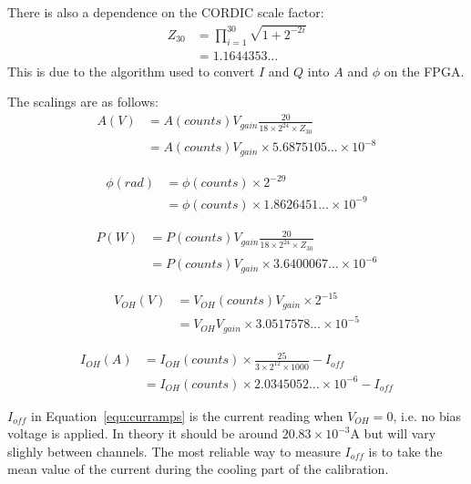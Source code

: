 \documentclass[12pt,a4paper]{article}
\begin{document}
There is also a dependence on the CORDIC scale factor:
\begin{equation}
  \label{equ:cordic}
  \begin{split}
    Z_{30} &= \prod_{i=1}^{30}\sqrt{1 + 2^{-2i}} \\
    &= 1.1644353\ldots
  \end{split}
\end{equation}
This is due to the algorithm used to convert $I$ and $Q$ into $A$ and $\phi$ on the FPGA.

The scalings are as follows:
\begin{equation}
  \label{equ:avolts}
  \begin{split}
    A(V) &= A(counts) V_{gain} \frac{20}{18 \times 2^{24} \times Z_{30}} \\
    &= A(counts) V_{gain} \times 5.6875105\ldots \times 10^{-8}
  \end{split}
\end{equation}

\begin{equation}
  \label{equ:phirad}
  \begin{split}
    \phi(rad) &= \phi(counts) \times 2^{-29} \\
    &= \phi(counts) \times 1.8626451\ldots \times 10^{-9}
  \end{split}
\end{equation}

\begin{equation}
  \label{equ:pwatts}
  \begin{split}
    P(W) &= P(counts) V_{gain} \frac{20}{18 \times 2^{24} \times Z_{30}} \\
    &= P(counts) V_{gain} \times 3.6400067\ldots \times 10^{-6}
  \end{split}
\end{equation}

\begin{equation}
  \label{equ:vdcvolts}
  \begin{split}
    V_{OH}(V) &= V_{OH}(counts) V_{gain} \times 2^{-15} \\
    &= V_{OH} V_{gain} \times 3.0517578\ldots \times 10^{-5}
  \end{split}
\end{equation}

\begin{equation}
  \label{equ:curramps}
  \begin{split}
    I_{OH}(A) &= I_{OH}(counts) \times \frac{25}{3 \times 2^{12} \times 1000} - I_{off} \\
    &= I_{OH}(counts) \times 2.0345052\ldots \times 10^{-6} - I_{off}
  \end{split}
\end{equation}

$I_{off}$ in Equation~\ref{equ:curramps} is the current reading when $V_{OH} = 0$, i.e. no bias voltage is applied. In theory it should be around
$20.83 \times 10^{-3} \mathrm{A}$ but will vary slighly between channels. The most reliable way to measure $I_{off}$ is to take the mean value of
the current during the cooling part of the calibration.



\end{document}
